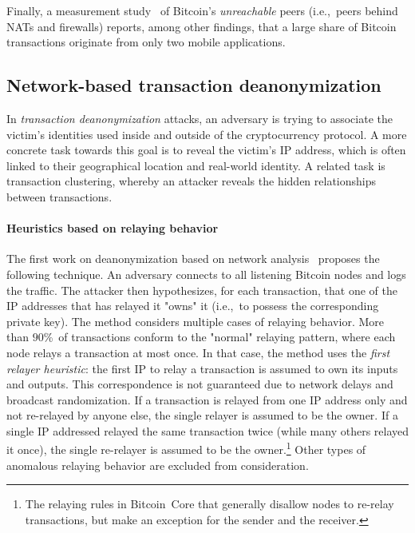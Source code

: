 Finally, a measurement study~\cite{Wang2017} of Bitcoin's \textit{unreachable} peers (i.e.,~peers behind NATs and firewalls) reports, among other findings, that a large share of Bitcoin transactions originate from only two mobile applications.


\subsection{Network-based transaction deanonymization}
\label{sec:network-analysis}

In \textit{transaction deanonymization} attacks, an adversary is trying to associate the victim's identities used inside and outside of the cryptocurrency protocol.
A more concrete task towards this goal is to reveal the victim's IP address, which is often linked to their geographical location and real-world identity.
A related task is transaction clustering, whereby an attacker reveals the hidden relationships between transactions.

\paragraph{Heuristics based on relaying behavior}

The first work on deanonymization based on network analysis~\cite{Koshy2014} proposes the following technique.
An adversary connects to all listening Bitcoin nodes and logs the traffic.
The attacker then hypothesizes, for each transaction, that one of the IP addresses that has relayed it "owns" it (i.e.,~to possess the corresponding private key).
The method considers multiple cases of relaying behavior.
More than $90$\%~of transactions conform to the "normal" relaying pattern, where each node relays a transaction at most once.
In that case, the method uses the \textit{first relayer heuristic}: the first IP to relay a transaction is assumed to own its inputs and outputs.
This correspondence is not guaranteed due to network delays and broadcast randomization.
If a transaction is relayed from one IP address only and not re-relayed by anyone else, the single relayer is assumed to be the owner.
If a single IP addressed relayed the same transaction twice (while many others relayed it once), the single re-relayer is assumed to be the owner.\footnote{The relaying rules in Bitcoin~Core that generally disallow nodes to re-relay transactions, but make an exception for the sender and the receiver.}
Other types of anomalous relaying behavior are excluded from consideration.

